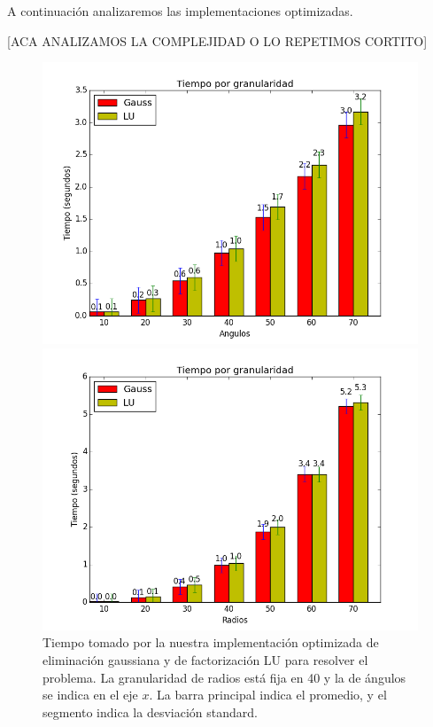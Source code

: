 A continuación analizaremos las implementaciones optimizadas.

[ACA ANALIZAMOS LA COMPLEJIDAD O LO REPETIMOS CORTITO]

\begin{figure}[H]
\centering
\begin{minipage}{0.48\textwidth}
  \centering
    \includegraphics[width=1\textwidth]{imgs/tiempos_opt_angulos.png}
  \caption{\footnotesize{Tiempo tomado por la nuestra implementación optimizada de eliminación gaussiana y de factorización LU para resolver el problema. La granularidad de radios está fija en 40 y la de ángulos se indica en el eje $x$. La barra principal indica el promedio, y el segmento indica la desviación standard.}}
  \label{fig:tiempoopt1}
\end{minipage}%
\hspace{0.03\textwidth}
\begin{minipage}{0.48\textwidth}   
  \centering
    \includegraphics[width=1\textwidth]{imgs/tiempos_opt_radios.png} 

\end{minipage}
\end{figure}
